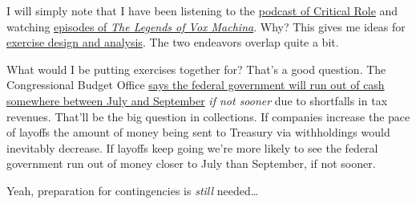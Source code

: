 I will simply note that I have been listening to the
\href{https://critrole.com/podcast/}{podcast of Critical Role} and
watching
\href{https://en.wikipedia.org/w/index.php?title=The_Legend_of_Vox_Machina&oldid=1139537661}{episodes
of \emph{The Legends of Vox Machina}}. Why? This gives me ideas for
\href{https://training.fema.gov/is/courseoverview.aspx?code=IS-120.c&lang=en}{exercise
design and analysis}. The two endeavors overlap quite a bit.

What would I be putting exercises together for? That's a good question.
The Congressional Budget Office
\href{https://www.theguardian.com/business/2023/feb/15/us-treasury-default-debt-ceiling}{says
the federal government will run out of cash somewhere between July and
September} \emph{if not sooner} due to shortfalls in tax revenues.
That'll be the big question in collections. If companies increase the
pace of layoffs the amount of money being sent to Treasury via
withholdings would inevitably decrease. If layoffs keep going we're more
likely to see the federal government run out of money closer to July
than September, if not sooner.

Yeah, preparation for contingencies is \emph{still} needed\ldots{}
